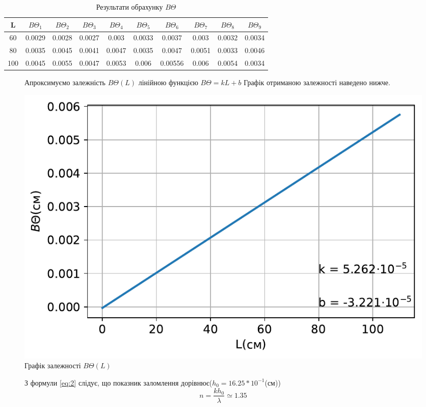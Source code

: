 \begin{table}[h!]
    \centering
    \begin{tabular}{|c|c|c|c|c|c|c|c|c|c|}
        \hline
        \textbf{L} & $B\Theta_1$ & $B\Theta_2$ & $B\Theta_3$ & $B\Theta_4$ & $B\Theta_5$ & $B\Theta_6$ & $B\Theta_7$ & $B\Theta_8$ & $B\Theta_9$ \\
        \hline
        60 & 0.0029 & 0.0028 & 0.0027 & 0.003 & 0.0033 & 0.0037 & 0.003 & 0.0032 & 0.0034 \\
        \hline
        80 & 0.0035 & 0.0045 & 0.0041 & 0.0047 & 0.0035 & 0.0047 & 0.0051 & 0.0033 & 0.0046 \\
        \hline
        100 & 0.0045 & 0.0055 & 0.0047 & 0.0053 & 0.006 & 0.00556 & 0.006 & 0.0054 & 0.0034 \\
        \hline
    \end{tabular}
    
    \caption{Результати обрахунку $B\Theta$}
\end{table}

\begin{figure}[h!]
    Апроксимуємо залежність $B\Theta(L)$ лінійною функцією $B\Theta = k L + b$
    Графік отриманою залежності наведено нижче.
\end{figure}

\begin{figure}[h!]    
    \centering
    \includegraphics[width=.6\textwidth]{assets/BQ(l).pdf}
    \caption{Графік залежності $B\Theta(L)$}
\end{figure}


\begin{figure}[h!]
    З формули \ref{eq:2} слідує, що показник заломлення дорівнює($h_0 = 16.25*10^{-1}$(см))
    $$ n = \frac{kh_0}{\lambda} \simeq 1.35 $$
\end{figure}
